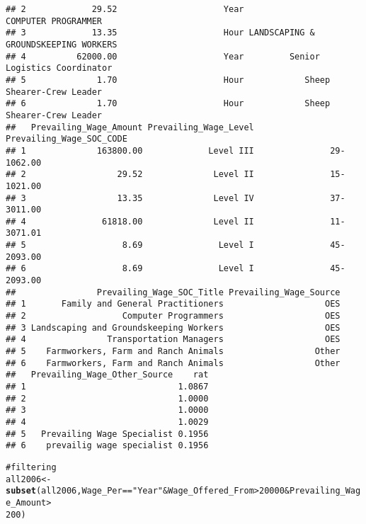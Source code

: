 \documentclass{article}\usepackage{graphicx, color}
\makeatletter
\newcommand{\hlfunctioncall}[1]{\textcolor[rgb]{0.501960784313725,0,0.329411764705882}{\textbf{#1}}}%
\newcommand{\hlstring}[1]{\textcolor[rgb]{0.6,0.6,1}{#1}}%
\newcommand{\hlcomment}[1]{\textcolor[rgb]{0.180392156862745,0.6,0.341176470588235}{#1}}%
\newenvironment{kframe}{%
 \def\at@end@of@kframe{}%
 \ifinner\ifhmode%
  \def\at@end@of@kframe{\end{minipage}}%
  \begin{minipage}{\columnwidth}%
 \fi\fi%
 \def\FrameCommand##1{\hskip\@totalleftmargin \hskip-\fboxsep
 \colorbox{shadecolor}{##1}\hskip-\fboxsep
     \hskip-\linewidth \hskip-\@totalleftmargin \hskip\columnwidth}%
 \MakeFramed {\advance\hsize-\width
   \@totalleftmargin\z@ \linewidth\hsize
   \@setminipage}}%
 {\par\unskip\endMakeFramed%
 \at@end@of@kframe}
\newenvironment{knitrout}{}{} %
\makeatother
\begin{document}
\begin{knitrout}
\begin{kframe}
\begin{verbatim}
## 2             29.52                     Year                  COMPUTER PROGRAMMER
## 3             13.35                     Hour LANDSCAPING & GROUNDSKEEPING WORKERS
## 4          62000.00                     Year         Senior Logistics Coordinator
## 5              1.70                     Hour            Sheep Shearer-Crew Leader
## 6              1.70                     Hour            Sheep Shearer-Crew Leader
##   Prevailing_Wage_Amount Prevailing_Wage_Level Prevailing_Wage_SOC_CODE
## 1              163800.00             Level III               29-1062.00
## 2                  29.52              Level II               15-1021.00
## 3                  13.35              Level IV               37-3011.00
## 4               61818.00              Level II               11-3071.01
## 5                   8.69               Level I               45-2093.00
## 6                   8.69               Level I               45-2093.00
##                Prevailing_Wage_SOC_Title Prevailing_Wage_Source
## 1       Family and General Practitioners                    OES
## 2                   Computer Programmers                    OES
## 3 Landscaping and Groundskeeping Workers                    OES
## 4                Transportation Managers                    OES
## 5    Farmworkers, Farm and Ranch Animals                  Other
## 6    Farmworkers, Farm and Ranch Animals                  Other
##   Prevailing_Wage_Other_Source    rat
## 1                              1.0867
## 2                              1.0000
## 3                              1.0000
## 4                              1.0029
## 5   Prevailing Wage Specialist 0.1956
## 6    prevailig wage specialist 0.1956
\end{verbatim}
\begin{alltt}

\hlcomment{# filtering}
all2006 <- \hlfunctioncall{subset}(all2006, Wage_Per == \hlstring{"Year"} & Wage_Offered_From > 20000 & Prevailing_Wage_Amount > 
    200)
\end{alltt}
\end{kframe}
\end{knitrout}
\end{document}
